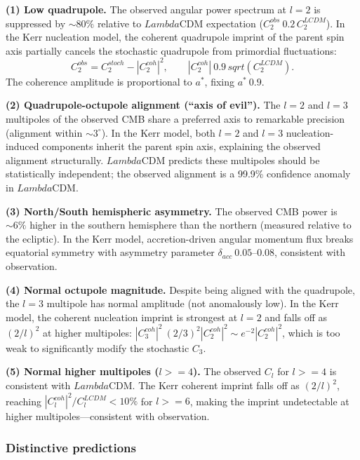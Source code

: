 \documentclass[11pt]{article}
\def\ell{l}%
\def\Lambda{Lambda}%
\def\mathrm#1{#1}%
\def\sqrt#1{sqrt(#1)}%
\def\geq{>=}%
\def\approx{~}%
\begin{document}
\textbf{(1) Low quadrupole.} The observed angular power spectrum at $\ell = 2$ is suppressed by $\sim 80\%$ relative to $\Lambda$CDM expectation ($C_2^{\mathrm{obs}} \approx 0.2\,C_2^{\mathrm{LCDM}}$). In the Kerr nucleation model, the coherent quadrupole imprint of the parent spin axis partially cancels the stochastic quadrupole from primordial fluctuations:
\begin{equation}
C_2^{\mathrm{obs}} = C_2^{\mathrm{stoch}} - |C_2^{\mathrm{coh}}|^2, \qquad |C_2^{\mathrm{coh}}| \approx 0.9\,\sqrt{C_2^{\mathrm{LCDM}}}.
\end{equation}
The coherence amplitude is proportional to $a^*$, fixing $a^* \approx 0.9$.

\textbf{(2) Quadrupole-octupole alignment (``axis of evil'').} The $\ell = 2$ and $\ell = 3$ multipoles of the observed CMB share a preferred axis to remarkable precision (alignment within $\sim 3^\circ$). In the Kerr model, both $\ell = 2$ and $\ell = 3$ nucleation-induced components inherit the parent spin axis, explaining the observed alignment structurally. $\Lambda$CDM predicts these multipoles should be statistically independent; the observed alignment is a 99.9\% confidence anomaly in $\Lambda$CDM.

\textbf{(3) North/South hemispheric asymmetry.} The observed CMB power is $\sim 6\%$ higher in the southern hemisphere than the northern (measured relative to the ecliptic). In the Kerr model, accretion-driven angular momentum flux breaks equatorial symmetry with asymmetry parameter $\delta_{\mathrm{acc}} \approx 0.05$--$0.08$, consistent with observation.

\textbf{(4) Normal octupole magnitude.} Despite being aligned with the quadrupole, the $\ell = 3$ multipole has normal amplitude (not anomalously low). In the Kerr model, the coherent nucleation imprint is strongest at $\ell = 2$ and falls off as $(2/\ell)^2$ at higher multipoles: $|C_3^{\mathrm{coh}}|^2 \approx (2/3)^2 |C_2^{\mathrm{coh}}|^2 \sim e^{-2}|C_2^{\mathrm{coh}}|^2$, which is too weak to significantly modify the stochastic $C_3$.

\textbf{(5) Normal higher multipoles ($\ell \geq 4$).} The observed $C_\ell$ for $\ell \geq 4$ is consistent with $\Lambda$CDM. The Kerr coherent imprint falls off as $(2/\ell)^2$, reaching $|C_\ell^{\mathrm{coh}}|^2/C_\ell^{\mathrm{LCDM}} < 10\%$ for $\ell \geq 6$, making the imprint undetectable at higher multipoles---consistent with observation.

\subsubsection{Distinctive predictions}
\end{document}
